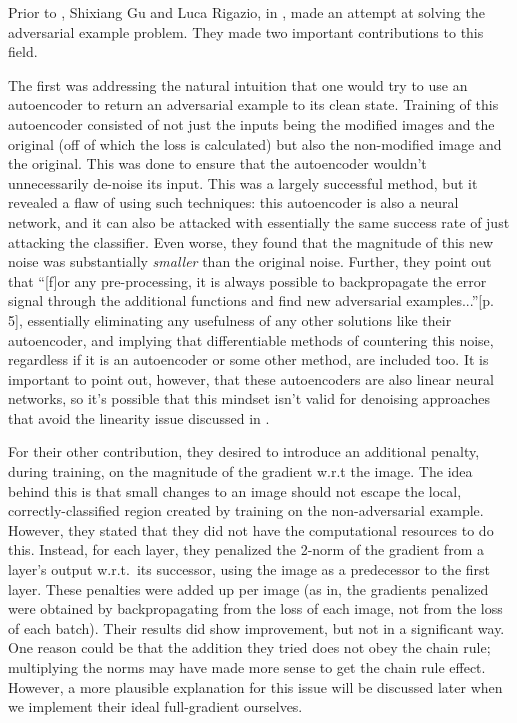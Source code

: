 Prior to \cite{goodfellow2015explaining}, Shixiang Gu and Luca Rigazio, in \cite{gu2015deep}, made
an attempt at solving the adversarial example problem. They made two important contributions to this
field.

The first was addressing the natural intuition that one would try to use an autoencoder to return an
adversarial example to its clean state. Training of this autoencoder consisted of not just the
inputs being the modified images and the original (off of which the loss is calculated) but also the
non-modified image and the original. This was done to ensure that the autoencoder wouldn't
unnecessarily de-noise its input. This was a largely successful method, but it revealed a flaw of
using such techniques: this autoencoder is also a neural network, and it can also be attacked with
essentially the same success rate of just attacking the classifier. Even worse, they found that the
magnitude of this new noise was substantially \textit{smaller} than the original noise. Further,
they point out that ``[f]or any pre-processing, it is always possible to backpropagate the error
signal through the additional functions and find new adversarial examples...''\cite{gu2015deep}[p.
5], essentially eliminating any usefulness of any other solutions like their autoencoder, and
implying that differentiable methods of countering this noise, regardless if it is an autoencoder or
some other method, are included too. It is important to point out, however, that these autoencoders
are also linear neural networks, so it's possible that this mindset isn't valid for denoising
approaches that avoid the linearity issue discussed in \cite{goodfellow2015explaining}.

For their other contribution, they desired to introduce an additional penalty, during training, on
the magnitude of the gradient w.r.t the image. The idea behind this is that small changes to an
image should not escape the local, correctly-classified region created by training on the
non-adversarial example. However, they stated that they did not have the computational resources to
do this. Instead, for each layer, they penalized the 2-norm of the gradient from a layer's output
w.r.t.\ its successor, using the image as a predecessor to the first layer. These penalties were
added up per image (as in, the gradients penalized were obtained by backpropagating from the loss of
each image, not from the loss of each batch). Their results did show improvement, but not in a
significant way. One reason could be that the addition they tried does not obey the chain rule;
multiplying the norms may have made more sense to get the chain rule effect. However, a more
plausible explanation for this issue will be discussed later when we implement their ideal
full-gradient ourselves.